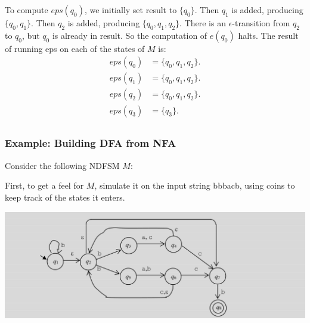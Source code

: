 \documentclass[hidelinks,12pt]{article}
\begin{document}
To compute $eps(q_0)$, we initially set result to $\{q_0\}$. Then $q_1$ is added, producing $\{q_0, q_1\}$. Then $q_2$ is added, producing
$\{q_0, q_1, q_2\}$. There is an $\epsilon$-transition from $q_2$ to $q_0$, but $q_0$ is already in result. So the computation of $e(q_0)$ halts.
The result of running eps on each of the states of $M$ is:
\begin{align*}
		eps(q_0)&= \{q_0, q_1, q_2\}.\\
		eps(q_1)&= \{q_0, q_1, q_2\}.\\
		eps(q_2)&= \{q_0, q_1, q_2\}.\\
		eps(q_3)&= \{q_3\}.\\
\end{align*}

\subsubsection{Example: Building DFA from NFA}

Consider the following NDFSM $M$:

First, to get a feel for $M$, simulate it on the input string bbbacb, using coins
to keep track of the states it enters.



\includegraphics[width=\linewidth]{./img/ndfsmtodfsm1.png}
\end{document}
